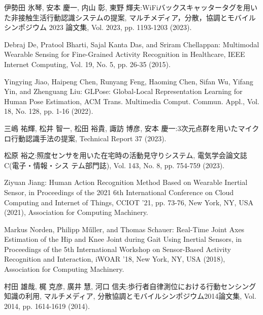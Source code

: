 \begin{thebibliography}{参考文献}
	伊勢田 氷琴, 安本 慶一, 内山 彰, 東野 輝夫:WiFiバックスキャッタータグを用いた非接触生活行動認識システムの提案, マルチメディア，分散，協調とモバイルシンポジウム 2023 論文集, Vol. 2023, pp. 1193-1203 (2023).

	Debraj De, Pratool Bharti, Sajal Kanta Das, and Sriram Chellappan: Multimodal Wearable Sensing for Fine-Grained Activity Recognition in Healthcare, IEEE Internet Computing, Vol. 19, No. 5, pp. 26-35 (2015).

	Yingying Jiao, Haipeng Chen, Runyang Feng, Haoming Chen, Sifan Wu, Yifang Yin, and Zhenguang Liu: GLPose: Global-Local Representation Learning for Human Pose Estimation, ACM Trans. Multimedia Comput. Commun. Appl., Vol. 18, No. 128, pp. 1-16 (2022).

	三嶋 祐輝, 松井 智一, 松田 裕貴, 諏訪 博彦, 安本 慶一:3次元点群を用いたマイクロ行動認識手法の提案, Technical Report 37 (2023).

	松原 裕之:照度センサを用いた在宅時の活動見守りシステム, 電気学会論文誌C(電子・情報・シス テム部門誌), Vol. 143, No. 8, pp. 754-759 (2023).

	Ziyuan Jiang: Human Action Recognition Method Based on Wearable Inertial Sensor, in Proceedings of the 2021 6th International Conference on Cloud Computing and Internet of Things, CCIOT '21, pp. 73-76, New York, NY, USA (2021), Association for Computing Machinery.

	Markus Norden, Philipp Műller, and Thomas Schauer: Real-Time Joint Axes Estimation of the Hip and Knee Joint during Gait Using Inertial Sensors, in Proceedings of the 5th International Workshop on Sensor-Based Activity Recognition and Interaction, iWOAR '18, New York, NY, USA (2018), Association for Computing Machinery.

	村田 雄哉, 梶 克彦, 廣井 慧, 河口 信夫:歩行者自律測位における行動センシング知識の利用, マルチメディア, 分散協調とモバイルシンポジウム2014論文集, Vol. 2014, pp. 1614-1619 (2014).
	

\end{thebibliography}
